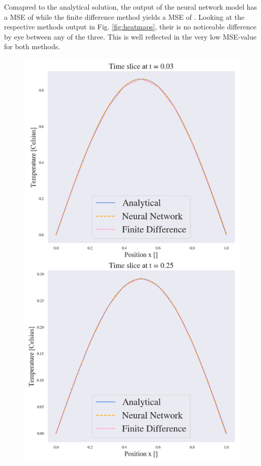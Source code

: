 Comapred to the analytical solution, the output of the neural network model has a MSE of  while the finite difference method yields a MSE of . 
Looking at the respective methods output in Fig. \ref{fig:heatmaps}, their is no noticeable difference by eye between any of the three.  
This is well reflected in the very low MSE-value for both methods. 


\begin{figure}[h!]
    \centering
    \includegraphics[width=1.0\linewidth]{project_3/plots/time_slices_comparison.png}

\end{figure}
